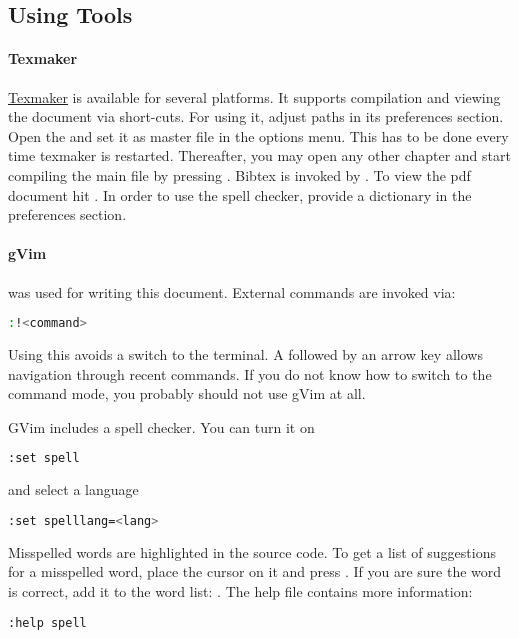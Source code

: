 \subsection{Using Tools}
%
\paragraph{Texmaker}
%
\href{http://www.xm1math.net/texmaker/}{Texmaker}
is available for several platforms. It supports compilation and viewing the 
document via short-cuts. 
For using it, adjust paths in its preferences section. 
Open the  and set it as master file in the options menu. 
This has to be done every time texmaker is restarted. 
Thereafter, you may open any other chapter and start compiling the main
file by pressing . Bibtex is invoked by .
To view the pdf document hit .
In order to use the spell checker, provide a dictionary in the preferences 
section.
%
\paragraph{gVim}
was used for writing this document.
External commands are invoked via:
\begin{lstlisting}[language=bash]
:!<command>
\end{lstlisting}
Using this avoids a switch to the terminal.
A \code{:} followed by an arrow key allows navigation through recent commands.
If you do not know how to switch to the command mode, you probably should not 
use gVim at all.
%
\par
%
GVim includes a spell checker.
You can turn it on
\begin{lstlisting}[language=bash]
:set spell
\end{lstlisting}
and select a language
\begin{lstlisting}[language=bash]
:set spelllang=<lang>
\end{lstlisting}
Misspelled words are highlighted in the source code.
To get a list of suggestions for a misspelled word, place the cursor on it
and press .
If you are sure the word is correct, add it to the word list: .
The help file contains more information:
\begin{lstlisting}[language=bash]
:help spell
\end{lstlisting}
%
%
%
